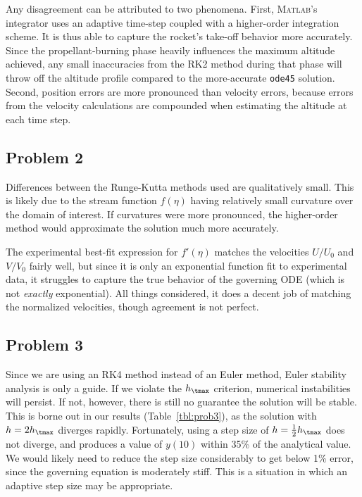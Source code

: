 \documentclass[12pt]{article}
\begin{document}
Any disagreement can be attributed to two phenomena. First, \textsc{Matlab}'s integrator uses an adaptive time-step coupled with a higher-order integration scheme. It is thus able to capture the rocket's take-off behavior more accurately. Since the propellant-burning phase heavily influences the maximum altitude achieved, any small inaccuracies from the RK2 method during that phase will throw off the altitude profile compared to the more-accurate \lstinline|ode45| solution. Second, position errors are more pronounced than velocity errors, because errors from the velocity calculations are compounded when estimating the altitude at each time step.

\subsection{Problem 2}

Differences between the Runge-Kutta methods used are qualitatively small. This is likely due to the stream function $f(\eta)$ having relatively small curvature over the domain of interest. If curvatures were more pronounced, the higher-order method would approximate the solution much more accurately.

The experimental best-fit expression for $f'(\eta)$ matches the velocities $U/U_0$ and $V/V_0$ fairly well, but since it is only an exponential function fit to experimental data, it struggles to capture the true behavior of the governing ODE (which is not \emph{exactly} exponential). All things considered, it does a decent job of matching the normalized velocities, though agreement is not perfect.

\subsection{Problem 3}

Since we are using an RK4 method instead of an Euler method, Euler stability analysis is only a guide. If we violate the $h_\tmax$ criterion, numerical instabilities will persist. If not, however, there is still no guarantee the solution will be stable. This is borne out in our results (Table~\ref{tbl:prob3}), as the solution with $h=2h_\tmax$ diverges rapidly. Fortunately, using a step size of $h=\tfrac{1}{2}h_\tmax$ does not diverge, and produces a value of $y(10)$ within 35\% of the analytical value. We would likely need to reduce the step size considerably to get below 1\% error, since the governing equation is moderately stiff. This is a situation in which an adaptive step size may be appropriate.
\end{document}
